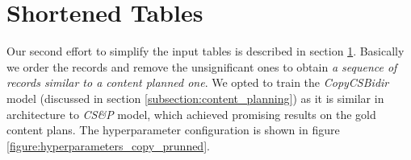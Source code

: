 \begin{table}[h]
    \centering
    \caption{Performance metrics on the Content Selection and Planning model.} \label{table:metrics_copy_ordered}
\end{table}

\section{Shortened Tables} \label{section:shortened_tables}

Our second effort to simplify the input tables is described in section \ref{section:shortened_tables}. Basically we order the records and remove the unsignificant ones to obtain \emph{a sequence of records similar to a content planned one}. We opted to train the \emph{CopyCSBidir} model (discussed in section \ref{subsection:content_planning}) as it is similar in architecture to \emph{CS\&P} model, which achieved promising results on the gold content plans. The hyperparameter configuration is shown in figure \ref{figure:hyperparameters_copy_prunned}.

